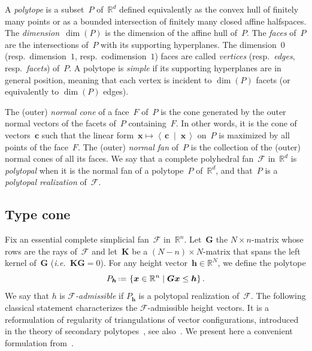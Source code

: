 \documentclass{amsart}
\theoremstyle{definition}
\newcommand{\R}{\mathbb{R}} %
\renewcommand{\b}[1]{{\boldsymbol{#1}}} %
\newcommand{\set}[2]{\left\{ #1 \;\middle|\; #2 \right\}} %
\newcommand{\dotprod}[2]{\left\langle \, #1 \; \middle| \; #2 \, \right\rangle} %
\newcommand{\eqdef}{\mbox{\,\raisebox{0.2ex}{\scriptsize\ensuremath{\mathrm:}}\ensuremath{=}\,}} %
\newcommand{\ie}{\textit{i.e.}~} %
\newcommand{\darkblue}{\color{darkblue}} %
\newcommand{\defn}[1]{\textsl{\darkblue #1}} %
\newcommand{\Fan}{\mathcal{F}} %
\begin{document}
A \defn{polytope} is a subset~$P$ of~$\R^d$ defined equivalently as the convex hull of finitely many points or as a bounded intersection of finitely many closed affine halfspaces.
The \defn{dimension}~$\dim(P)$ is the dimension of the affine hull of~$P$.
The \defn{faces} of~$P$ are the intersections of~$P$ with its supporting hyperplanes.
The dimension~$0$ (resp.~dimension~$1$, resp.~codimension~$1$) faces are called \defn{vertices} (resp.~\defn{edges}, resp.~\defn{facets}) of~$P$.
A polytope is \defn{simple} if its supporting hyperplanes are in general position, meaning that each vertex is incident to $\dim(P)$ facets (or equivalently to $\dim(P)$ edges).

The (outer) \defn{normal cone} of a face~$F$ of~$P$ is the cone generated by the outer normal vectors of the facets of~$P$ containing~$F$.
In other words, it is the cone of vectors~$\b{c}$ such that the linear form~${\b{x} \mapsto \dotprod{\b{c}}{\b{x}}}$ on~$P$ is maximized by all points of the face~$F$.
The (outer) \defn{normal fan} of~$P$ is the collection of the (outer) normal cones of all its faces.
We say that a complete polyhedral fan~$\Fan$ in~$\R^d$ is \defn{polytopal} when it is the normal fan of a polytope~$P$ of~$\R^d$, and that~$P$ is a \defn{polytopal realization} of~$\Fan$.


\subsection{Type cone}

Fix an essential complete simplicial fan~$\Fan$ in~$\R^n$. Let~$\b{G}$ the $N \times n$-matrix whose rows are the rays of~$\Fan$ and let~$\b{K}$ be a $(N-n) \times N$-matrix that spans the left kernel of~$\b{G}$ (\ie $\b{K}\b{G} = 0$). For any height vector~$\b{h} \in \R^N$, we define the polytope
\[
P_\b{h} \eqdef \set{\b{x} \in \R^n}{\b{G}\b{x} \le \b{h}}.
\]
We say that $h$ is \defn{$\Fan$-admissible} if $P_\b{h}$ is a polytopal realization of~$\Fan$.
The following classical statement characterizes the $\Fan$-admissible height vectors.
It is a reformulation of regularity of triangulations of vector configurations, introduced in the theory of secondary polytopes~\cite{GelfandKapranovZelevinsky}, see also~\cite{DeLoeraRambauSantos}.
We present here a convenient formulation from~\cite[Lem.~2.1]{ChapotonFominZelevinsky}.
\end{document}

